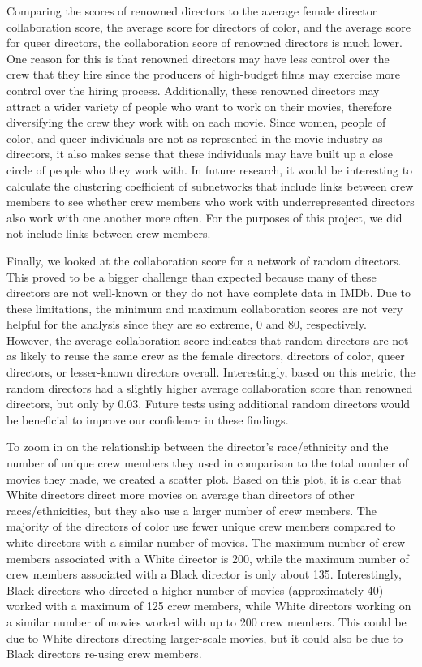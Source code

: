 \documentclass[12pt]{article}
\begin{document}
\par
Comparing the scores of renowned directors to the average female director collaboration score, the average score for directors of color, and the average score for queer directors, the collaboration score of renowned directors is much lower. One reason for this is that renowned directors may have less control over the crew that they hire since the producers of high-budget films may exercise more control over the hiring process. Additionally, these renowned directors may attract a wider variety of people who want to work on their movies, therefore diversifying the crew they work with on each movie. Since women, people of color, and queer individuals are not as represented in the movie industry as directors, it also makes sense that these individuals may have built up a close circle of people who they work with. In future research, it would be interesting to calculate the clustering coefficient of subnetworks that include links between crew members to see whether crew members who work with underrepresented directors also work with one another more often. For the purposes of this project, we did not include links between crew members.
\par
Finally, we looked at the collaboration score for a network of random directors. This proved to be a bigger challenge than expected because many of these directors are not well-known or they do not have complete data in IMDb. Due to these limitations, the minimum and maximum collaboration scores are not very helpful for the analysis since they are so extreme, 0 and 80, respectively. However, the average collaboration score indicates that random directors are not as likely to reuse the same crew as the female directors, directors of color, queer directors, or lesser-known directors overall. Interestingly, based on this metric, the random directors had a slightly higher average collaboration score than renowned directors, but only by 0.03. Future tests using additional random directors would be beneficial to improve our confidence in these findings.
\par
To zoom in on the relationship between the director's race/ethnicity and the number of unique crew members they used in comparison to the total number of movies they made, we created a scatter plot. Based on this plot, it is clear that White directors direct more movies on average than directors of other races/ethnicities, but they also use a larger number of crew members. The majority of the directors of color use fewer unique crew members compared to white directors with a similar number of movies. The maximum number of crew members associated with a White director is 200, while the maximum number of crew members associated with a Black director is only about 135. Interestingly, Black directors who directed a higher number of movies (approximately 40) worked with a maximum of 125 crew members, while White directors working on a similar number of movies worked with up to 200 crew members. This could be due to White directors directing larger-scale movies, but it could also be due to Black directors re-using crew members. 
\end{document}
